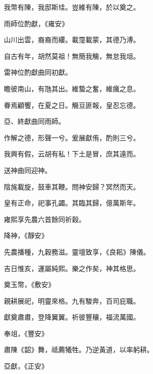 \begin{pinyinscope}
 我幣有陳，我邸斯珪。豈維有陳，於以奠之。



 雨師位酌獻，《雍安》



 山川出雲，裔裔而縷。載霪載蒙，其德乃溥。



 自古有年，胡然莫祖！無簡我觴，無怠我俎。



 雷神位酌獻曲同初獻。



 瞻彼南山，有虺其出。維蟄之奮，維癘之息。



 眷焉顧饗，在夏之日。觴豆匪報，皇忍忘德。



 亞、終獻曲同雨師。



 作解之德，形聲一兮。爰展獻侑，酌則三兮。



 我興有假，云胡有私！下土是冒，庶其遠而。



 送神曲同迎神。



 陰旄載旋，鼓車其鞭。問神安歸？冥然而天。



 皇有正命，祀事孔蠲。其臨其歸，億萬斯年。



 雍熙享先農六首餘同祈穀。



 降神，《靜安》



 先農播種，九穀務滋。靈壇致享，《良耜》陳儀。



 吉日惟亥，運屬純熙。樂之作矣，神其格思。



 奠玉幣，《敷安》



 親耕展祀，明靈來格。九有駿奔，百司庇職。



 獻奠肅肅，登降翼翼。祈彼豐穰，福流萬國。



 奉俎，《豐安》



 肅陳《韶》舞，祗薦犧牲。乃逆黃道，以率躬耕。



 亞獻，《正安》




\end{pinyinscope}
